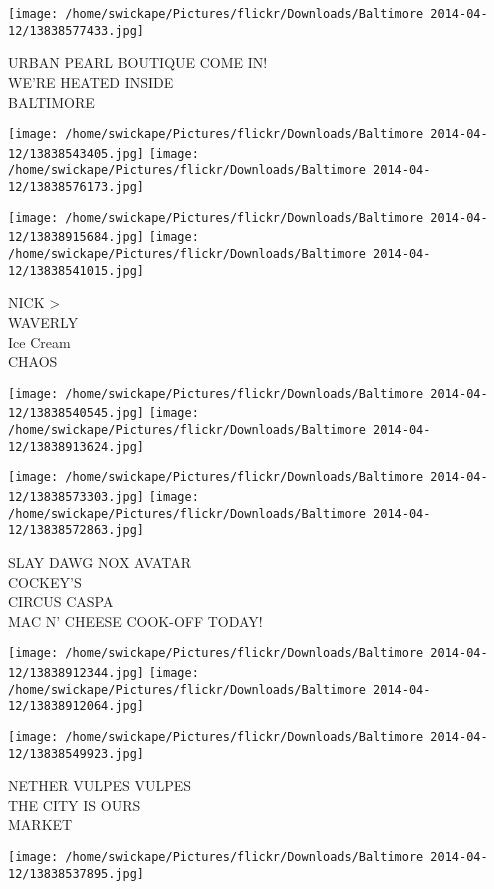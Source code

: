 \documentclass[10pt,letterpaper]{article}
\begin{document}
\vspace{0.25in}
\texttt{[image: /home/swickape/Pictures/flickr/Downloads/Baltimore 2014-04-12/13838577433.jpg]}

URBAN PEARL BOUTIQUE COME IN!\\
WE'RE HEATED INSIDE\\
BALTIMORE
\pagebreak

\texttt{[image: /home/swickape/Pictures/flickr/Downloads/Baltimore 2014-04-12/13838543405.jpg]}
\texttt{[image: /home/swickape/Pictures/flickr/Downloads/Baltimore 2014-04-12/13838576173.jpg]}

\texttt{[image: /home/swickape/Pictures/flickr/Downloads/Baltimore 2014-04-12/13838915684.jpg]}
\texttt{[image: /home/swickape/Pictures/flickr/Downloads/Baltimore 2014-04-12/13838541015.jpg]}

NICK >\\
WAVERLY\\
Ice Cream\\
CHAOS
\pagebreak

\texttt{[image: /home/swickape/Pictures/flickr/Downloads/Baltimore 2014-04-12/13838540545.jpg]}
\texttt{[image: /home/swickape/Pictures/flickr/Downloads/Baltimore 2014-04-12/13838913624.jpg]}

\texttt{[image: /home/swickape/Pictures/flickr/Downloads/Baltimore 2014-04-12/13838573303.jpg]}
\texttt{[image: /home/swickape/Pictures/flickr/Downloads/Baltimore 2014-04-12/13838572863.jpg]}

SLAY DAWG NOX AVATAR\\
COCKEY'S\\
CIRCUS CASPA\\
MAC N' CHEESE COOK{-}OFF TODAY!
\pagebreak

\texttt{[image: /home/swickape/Pictures/flickr/Downloads/Baltimore 2014-04-12/13838912344.jpg]}
\texttt{[image: /home/swickape/Pictures/flickr/Downloads/Baltimore 2014-04-12/13838912064.jpg]}

\texttt{[image: /home/swickape/Pictures/flickr/Downloads/Baltimore 2014-04-12/13838549923.jpg]}

NETHER VULPES VULPES\\
THE CITY IS OURS\\
MARKET
\pagebreak

\texttt{[image: /home/swickape/Pictures/flickr/Downloads/Baltimore 2014-04-12/13838537895.jpg]}
\end{document}
